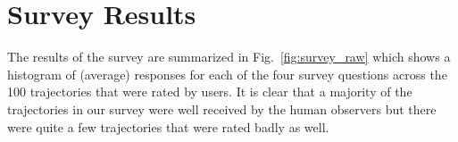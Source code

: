 \documentclass[letterpaper, 10 pt, conference]{ieeeconf}  %
\begin{document}
\section{Survey Results}
\label{sec:analysis}
The results of the survey are summarized in Fig.~\ref{fig:survey_raw} which shows a histogram of (average) responses for each of the four survey questions across the 100 trajectories that were rated by users. It is clear that a majority of the trajectories in our survey were well received by the human observers but there were quite a few trajectories that were rated badly as well. 
\begin{figure}[t]

\end{figure}
\end{document}
